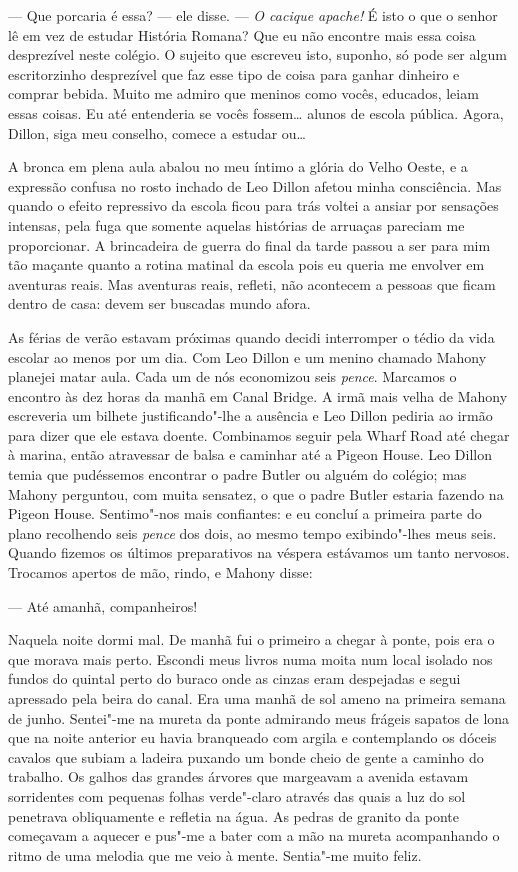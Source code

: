 --- Que porcaria é essa? --- ele disse.  --- \textit{O cacique apache!}  É isto
o que o senhor lê em vez de estudar História Romana?  Que eu não encontre mais
essa coisa desprezível neste colégio.  O sujeito que escreveu isto, suponho, só
pode ser algum escritorzinho desprezível que faz esse tipo de coisa para ganhar
dinheiro e comprar bebida.  Muito me admiro que meninos como vocês, educados,
leiam essas coisas.  Eu até entenderia se vocês fossem\ldots{} alunos de escola
pública.  Agora, Dillon, siga meu conselho, comece a estudar ou\ldots{}

A bronca em plena aula abalou no meu íntimo a glória do Velho Oeste, e a
expressão confusa no rosto inchado de Leo Dillon afetou minha consciência.  Mas
quando o efeito repressivo da escola ficou para trás voltei a ansiar por
sensações intensas, pela fuga que somente aquelas histórias de arruaças
pareciam me proporcionar.  A brincadeira de guerra do final da tarde passou a
ser para mim tão maçante quanto a rotina matinal da escola pois eu queria me
envolver em aventuras reais.  Mas aventuras reais, refleti, não acontecem a
pessoas que ficam dentro de casa: devem ser buscadas mundo afora.

As férias de verão estavam próximas quando decidi interromper o tédio da vida
escolar ao menos por um dia.  Com Leo Dillon e um menino chamado Mahony
planejei matar aula.  Cada um de nós economizou seis \textit{pence}.  Marcamos
o encontro às dez horas da manhã em Canal Bridge.  A irmã mais velha de Mahony
escreveria um bilhete justificando"-lhe a ausência e Leo Dillon pediria ao irmão
para dizer que ele estava doente.  Combinamos seguir pela Wharf Road até chegar
à marina, então atravessar de balsa e caminhar até a Pigeon House.  Leo Dillon
temia que pudéssemos encontrar o padre Butler ou alguém do colégio; mas Mahony
perguntou, com muita sensatez, o que o padre Butler estaria fazendo na Pigeon
House.  Sentimo"-nos mais confiantes: e eu concluí a primeira parte do plano
recolhendo seis \textit{pence} dos dois, ao mesmo tempo exibindo"-lhes meus
seis.  Quando fizemos os últimos preparativos na véspera estávamos um tanto
nervosos.  Trocamos apertos de mão, rindo, e Mahony disse:

--- Até amanhã, companheiros!

Naquela noite dormi mal.  De manhã fui o primeiro a chegar à ponte, pois era o
que morava mais perto.  Escondi meus livros numa moita num local isolado nos
fundos do quintal perto do buraco onde as cinzas eram despejadas e segui
apressado pela beira do canal.  Era uma manhã de sol ameno na primeira semana
de junho.  Sentei"-me na mureta da ponte admirando meus frágeis sapatos de lona
que na noite anterior eu havia branqueado com argila e contemplando os dóceis
cavalos que subiam a ladeira puxando um bonde cheio de gente a caminho do
trabalho.  Os galhos das grandes árvores que margeavam a avenida estavam
sorridentes com pequenas folhas verde"-claro através das quais a luz do sol
penetrava obliquamente e refletia na água.  As pedras de granito da ponte
começavam a aquecer e pus"-me a bater com a mão na mureta acompanhando o ritmo
de uma melodia que me veio à mente.  Sentia"-me muito feliz.

